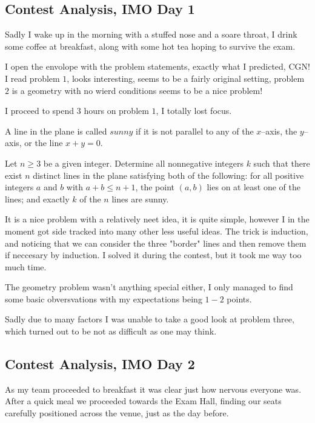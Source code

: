 \documentclass{article}
\begin{document}
\subsection{Contest Analysis, IMO Day 1}

Sadly I wake up in the morning with a stuffed nose and a soare throat, I drink some coffee at breakfast, along with some hot tea hoping to survive the exam.

I open the envolope with the problem statements, exactly what I predicted, CGN! I read problem \(1\), looks interesting, seems to be a fairly original setting, problem \(2\) is a geometry with no wierd conditions seems to be a nice problem!

I proceed to spend \(3\) hours on problem \(1\), I totally lost focus.

\begin{problem}[IMO 2025 P1]
  A line in the plane is called $sunny$ if it is not parallel to any of the $x$–axis, the $y$–axis, or the line $x+y=0$.

Let $n\ge3$ be a given integer. Determine all nonnegative integers $k$ such that there exist $n$ distinct lines in the plane satisfying both of the following:
for all positive integers $a$ and $b$ with $a+b\le n+1$, the point $(a,b)$ lies on at least one of the lines; and
exactly $k$ of the $n$ lines are sunny.
\end{problem}

It is a nice problem with a relatively neet idea, it is quite simple, however I in the moment got side tracked into many other less useful ideas. The trick is induction, and noticing that we can consider the three "border" lines and then remove them if neccesary by induction. I solved it during the contest, but it took me way too much time.

The geometry problem wasn't anything special either, I only managed to find some basic obversvations with my expectations being \(1-2\) points.

Sadly due to many factors I was unable to take a good look at problem three, which turned out to be not as difficult as one may think.

\subsection{Contest Analysis, IMO Day 2}

As my team proceeded to breakfast it was clear just how nervous everyone was. After a quick meal we proceeded towards the Exam Hall, finding our seats carefully positioned across the venue, just as the day before.
\end{document}
